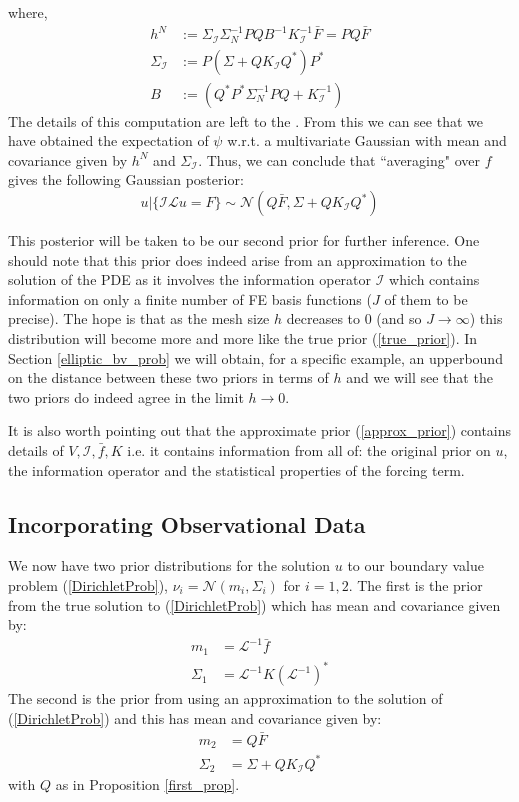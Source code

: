 where,
\begin{align}
    h^{N}&:=\Sigma_{\mathcal{I}}\Sigma_{N}^{-1}PQB^{-1}K_{\mathcal{I}}^{-1}\bar{F}=PQ\bar{F} \\
    \Sigma_{\mathcal{I}}&:=P(\Sigma+QK_{\mathcal{I}}Q^{*})P^{*} \\
    B &:= \left(Q^{*}P^{*}\Sigma_{N}^{-1}PQ+K_{\mathcal{I}}^{-1}\right)
\end{align}
The details of this computation are left to the \textcolor{blue}{}. From this we can see that we have obtained the expectation of $\psi$ w.r.t. a multivariate Gaussian with mean and covariance given by $h^{N}$ and $\Sigma_{\mathcal{I}}$. Thus, we can conclude that ``averaging" over $f$ gives the following Gaussian posterior:
\begin{equation}
    u|\{\mathcal{I}\mathcal{L}u=F\}\sim\mathcal{N}\left(Q\bar{F},\Sigma+QK_{\mathcal{I}}Q^{*}\right)
\end{equation}
\qedsymbol

This posterior will be taken to be our second prior for further inference. One should note that this prior does indeed arise from an approximation to the solution of the PDE as it involves the information operator $\mathcal{I}$ which contains information on only a finite number of FE basis functions ($J$ of them to be precise). The hope is that as the mesh size $h$ decreases to $0$ (and so $J\rightarrow\infty$) this distribution will become more and more like the true prior (\ref{true_prior}). In Section \textcolor{blue}{\ref{elliptic_bv_prob}} we will obtain, for a specific example, an upperbound on the distance between these two priors in terms of $h$ and we will see that the two priors do indeed agree in the limit $h\rightarrow 0$.

It is also worth pointing out that the approximate prior (\ref{approx_prior}) contains details of $V,\mathcal{I},\bar{f},K$ i.e. it contains information from all of: the original prior on $u$, the information operator and the statistical properties of the forcing term.

\subsection{Incorporating Observational Data}
\label{incorporating_obs_data}

We now have two prior distributions for the solution $u$ to our boundary value problem (\ref{DirichletProb}), $\nu_{i}=\mathcal{N}(m_{i},\Sigma_{i})$ for $i=1,2$. The first is the prior from the true solution to (\ref{DirichletProb}) which has mean and covariance given by:
\begin{align}
    m_{1} &= \mathcal{L}^{-1}\bar{f} \\
    \Sigma_{1} &= \mathcal{L}^{-1}K(\mathcal{L}^{-1})^{*}
\end{align}
The second is the prior from using an approximation to the solution of (\ref{DirichletProb}) and this has mean and covariance given by:
\begin{align}
    m_{2} &= Q\bar{F} \\
    \Sigma_{2} &= \Sigma + QK_{\mathcal{I}}Q^{*}
\end{align}
with $Q$ as in Proposition \textcolor{blue}{\ref{first_prop}}.


